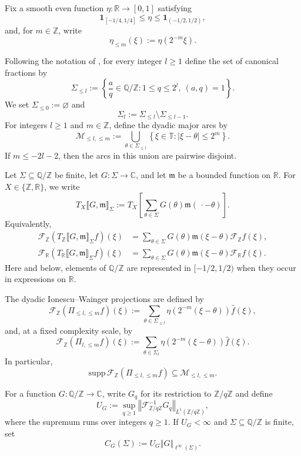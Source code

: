 \documentclass[12pt,leqno]{amsart}
\def\R {\mathbb{R}}
\def\supp {{\mathrm{supp}\,}}
\def\Z {{\mathbb Z}}
\def\CC{\mathbb{C}}
\newcommand{\TT}{\mathbb{ T} }
\newcommand{\F}{\mathcal{F}}
\def\ind{\cic{1}}
\newcommand{\cic}{\bm}
\numberwithin{equation}{section}
\numberwithin{counter2}{section}
\theoremstyle{definition}
\theoremstyle{plain}
\newcommand{\norm}[1]{\left\Vert #1\right\Vert}
\begin{document}
Fix a smooth even function $\eta\colon\R\to[0,1]$ satisfying
\[
\ind_{[-1/4,1/4]}\leq\eta\leq\ind_{(-1/2,1/2)},
\]
and, for $m\in\Z$, write
\[
\eta_{\leq m}(\xi):=\eta(2^{-m}\xi).
\]

Following the notation of \cite{KMSZ26}, for every integer $l\geq1$ define the set of canonical fractions by
\begin{equation}\label{eq canonical fracs}
\Sigma_{\leq l}
:=\left\{
\frac{a}{q}\in\mathbb Q/\Z:
1\leq q\leq 2^l,\ (a,q)=1
\right\}.
\end{equation}
We set $\Sigma_{\leq0}:=\varnothing$ and
\[
\Sigma_l:=\Sigma_{\leq l}\setminus\Sigma_{\leq l-1}.
\]
For integers $l\geq1$ and $m\in\Z$, define the dyadic major arcs by
\[
\mathcal M_{\leq l,\leq m}
:=\bigcup_{\theta\in\Sigma_{\leq l}}
\left\{\xi\in\TT:|\xi-\theta|\leq2^m\right\}.
\]
If $m\leq-2l-2$, then the arcs in this union are pairwise disjoint.

Let $\Sigma\subseteq\mathbb Q/\Z$ be finite, let $G\colon\Sigma\to\CC$, and let $\mathfrak m$ be a bounded function on $\R$. For $X\in\{\Z,\R\}$, we write
\[
T_X\llbracket G,\mathfrak m\rrbracket_{\Sigma}
:=T_X\left[\sum_{\theta\in\Sigma}
G(\theta)\mathfrak m(\,\cdot-\theta)\right].
\]
Equivalently,
\begin{align*}
\F_{\Z}\left(T_{\Z}\llbracket G,\mathfrak m\rrbracket_{\Sigma}f\right)(\xi)
&=\sum_{\theta\in\Sigma}G(\theta)\mathfrak m(\xi-\theta)\F_{\Z}f(\xi),\\
\F_{\R}\left(T_{\R}\llbracket G,\mathfrak m\rrbracket_{\Sigma}f\right)(\xi)
&=\sum_{\theta\in\Sigma}G(\theta)\mathfrak m(\xi-\theta)\F_{\R}f(\xi).
\end{align*}
Here and below, elements of $\mathbb Q/\Z$ are represented in $[-1/2,1/2)$ when they occur in expressions on $\R$.

The dyadic Ionescu--Wainger projections are defined by
\[
\F_{\Z}\left(\Pi_{\leq l,\leq m}f\right)(\xi)
:=\sum_{\theta\in\Sigma_{\leq l}}
\eta\left(2^{-m}(\xi-\theta)\right)\widehat f(\xi),
\]
and, at a fixed complexity scale, by
\[
\F_{\Z}\left(\Pi_{l,\leq m}f\right)(\xi)
:=\sum_{\theta\in\Sigma_l}
\eta\left(2^{-m}(\xi-\theta)\right)\widehat f(\xi).
\]
In particular,
\[
\supp\F_{\Z}\left(\Pi_{\leq l,\leq m}f\right)
\subseteq\mathcal M_{\leq l,\leq m}.
\]

For a function $G\colon\mathbb Q/\Z\to\CC$, write $G_q$ for its restriction to $\Z/q \Z $  and define
\[
U_G
:=\sup_{q\geq1}
\norm{\F^{-1}_{\Z/q\Z}G_q}_{L^1(\Z/q\Z)},
\]
where the supremum runs over integers $q\geq1$. If $U_G<\infty$ and $\Sigma\subseteq\mathbb Q/\Z$ is finite, set
\begin{equation}\label{eq CG}
C_G(\Sigma):=U_G\norm{G}_{\ell^{\infty}(\Sigma)}.
\end{equation}
\end{document}

